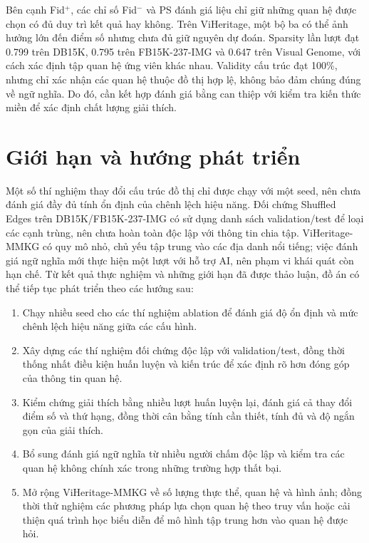 Bên cạnh Fid$^+$, các chỉ số Fid$^-$ và PS đánh giá liệu chỉ giữ những quan hệ được chọn có đủ duy trì kết quả hay không. Trên ViHeritage, một bộ ba có thể ảnh hưởng lớn đến điểm số nhưng chưa đủ giữ nguyên dự đoán. Sparsity lần lượt đạt 0.799 trên DB15K, 0.795 trên FB15K-237-IMG và 0.647 trên Visual Genome, với cách xác định tập quan hệ ứng viên khác nhau. Validity cấu trúc đạt 100\%, nhưng chỉ xác nhận các quan hệ thuộc đồ thị hợp lệ, không bảo đảm chúng đúng về ngữ nghĩa. Do đó, cần kết hợp đánh giá bằng can thiệp với kiểm tra kiến thức miền để xác định chất lượng giải thích.


\section{Giới hạn và hướng phát triển}
\label{sec:future-directions-discussion}

Một số thí nghiệm thay đổi cấu trúc đồ thị chỉ được chạy với một seed, nên chưa đánh giá đầy đủ tính ổn định của chênh lệch hiệu năng. Đối chứng Shuffled Edges trên DB15K/FB15K-237-IMG có sử dụng danh sách validation/test để loại các cạnh trùng, nên chưa hoàn toàn độc lập với thông tin chia tập. ViHeritage-MMKG có quy mô nhỏ, chủ yếu tập trung vào các địa danh nổi tiếng; việc đánh giá ngữ nghĩa mới thực hiện một lượt với hỗ trợ AI, nên phạm vi khái quát còn hạn chế.
Từ kết quả thực nghiệm và những giới hạn đã được
thảo luận, đồ án có thể tiếp tục phát triển theo
các hướng sau:

\begin{enumerate}
    \item Chạy nhiều seed cho các thí nghiệm ablation để đánh giá độ ổn định và mức chênh lệch hiệu năng giữa các cấu hình.
    \item Xây dựng các thí nghiệm đối chứng độc lập với validation/test, đồng thời thống nhất điều kiện huấn luyện và kiến trúc để xác định rõ hơn đóng góp của thông tin quan hệ.
    \item Kiểm chứng giải thích bằng nhiều lượt huấn luyện lại, đánh giá cả thay đổi điểm số và thứ hạng, đồng thời cân bằng tính cần thiết, tính đủ và độ ngắn gọn của giải thích.
    \item Bổ sung đánh giá ngữ nghĩa từ nhiều người chấm độc lập và kiểm tra các quan hệ không chính xác trong những trường hợp thất bại.
    \item Mở rộng ViHeritage-MMKG về số lượng thực thể, quan hệ và hình ảnh; đồng thời thử nghiệm các phương pháp lựa chọn quan hệ theo truy vấn hoặc cải thiện quá trình học biểu diễn để mô hình tập trung hơn vào quan hệ được hỏi.
\end{enumerate}
